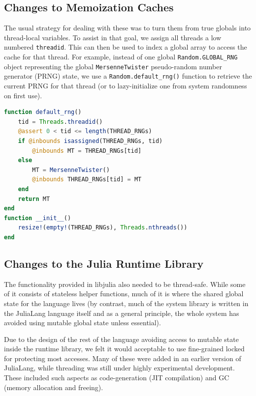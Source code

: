 \documentclass{juliacon}
\begin{document}
\subsection{Changes to Memoization Caches}
\label{subsub:integration-caches}

The usual strategy for dealing with these was to turn them from true globals into thread-local variables. To assist in that goal, we assign all threads a low numbered \verb|threadid|. This can then be used to index a global array to access the cache for that thread. For example, instead of one global \verb|Random.GLOBAL_RNG| object representing the global \verb|MersenneTwister| pseudo-random number generator (PRNG) state, we use a \verb|Random.default_rng()| function to retrieve the current PRNG for that thread (or to lazy-initialize one from system randomness on first use).

\begin{lstlisting}[language = Julia]
function default_rng()
    tid = Threads.threadid()
    @assert 0 < tid <= length(THREAD_RNGs)
    if @inbounds isassigned(THREAD_RNGs, tid)
        @inbounds MT = THREAD_RNGs[tid]
    else
        MT = MersenneTwister()
        @inbounds THREAD_RNGs[tid] = MT
    end
    return MT
end
function __init__()
    resize!(empty!(THREAD_RNGs), Threads.nthreads())
end
\end{lstlisting}


\subsection{Changes to the Julia Runtime Library}
\label{subsub:integration-runtime}

The functionality provided in libjulia also needed to be thread-safe. While some of it consists of stateless helper functions, much of it is where the shared global state for the language lives (by contrast, much of the system library is written in the JuliaLang language itself and as a general principle, the whole system has avoided using mutable global state unless essential).

Due to the design of the rest of the language avoiding access to mutable state inside the runtime library, we felt it would acceptable to use fine-grained locked for protecting most accesses. Many of these were added in an earlier version of JuliaLang, while threading was still under highly experimental development. These included such aspects as code-generation (JIT compilation) and GC (memory allocation and freeing).
\end{document}
